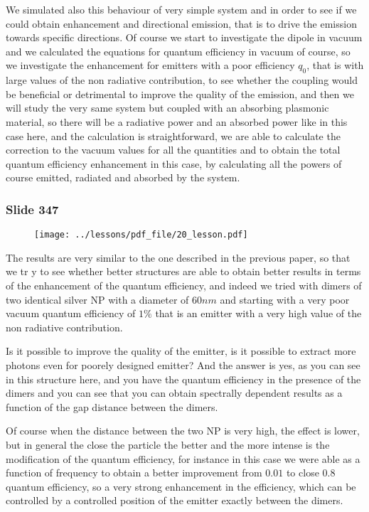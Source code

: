 \documentclass[../main/main.tex]{subfiles}
\begin{document}
We simulated also this behaviour of very simple system and in order to see if we could obtain enhancement and directional emission, that is to drive the emission towards specific directions. Of course we start to investigate the dipole in vacuum and we calculated the equations for quantum efficiency in vacuum of course, so we investigate the enhancement for emitters with a poor efficiency $q_0$, that is with large values of the non radiative contribution, to see whether the coupling would be beneficial or detrimental to improve the quality of the emission, and then we will study the very same system but coupled with an absorbing plasmonic material, so there will be a radiative power and an absorbed power like in this case here, and the calculation is straightforward, we are able to calculate the correction to the vacuum values for all the quantities and to obtain the total quantum efficiency enhancement in this case, by calculating all the powers of course emitted, radiated and absorbed by the system.


\newpage

\subsubsection{Slide 347}

\begin{figure}[h!]
\centering
\texttt{[image: ../lessons/pdf\_file/20\_lesson.pdf]}
\end{figure}

The results are very similar to the one described in the previous paper, so that we tr y to see whether better structures are able to obtain better results in terms of the enhancement of the quantum efficiency, and indeed we tried with dimers of two identical silver NP with a diameter of $60 nm$ and starting with a very poor vacuum quantum efficiency of $1\%$ that is an emitter with a very high value of the non radiative contribution.

Is it possible to improve the quality of the emitter, is it possible to extract more photons even for poorely designed emitter? And the answer is yes, as you can see in this structure here, and you have the quantum efficiency in the presence of the dimers and you can see that you can obtain spectrally dependent results as a function of the gap distance between the dimers.

Of course when the distance between the two NP is very high, the effect is lower, but in general the close the particle the better and the more intense is the modification of the quantum efficiency, for instance in this case we were able as a function of frequency to obtain a better improvement from $0.01$ to close $0.8$ quantum efficiency, so a very strong enhancement in the efficiency, which can be controlled by a controlled position of the emitter exactly between the dimers.
\end{document}
